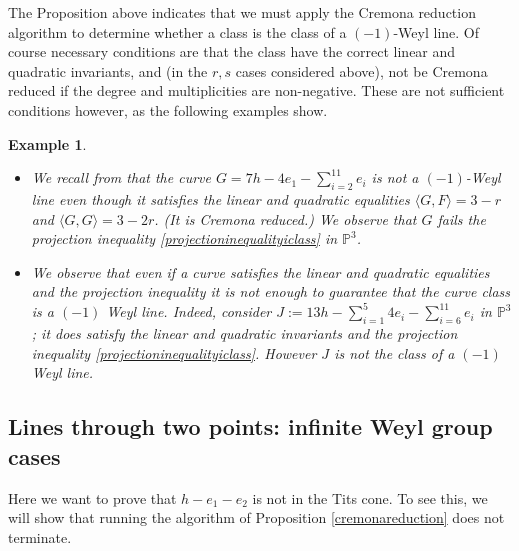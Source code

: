 \documentclass[12pt]{article}
\numberwithin{equation}{section}
\newtheorem{example}[equation]{Example}
\numberwithin{equation}{section}
\numberwithin{subeq}{equation}
\def\bbP{\mathbb{P}}
\begin{document}
The Proposition above indicates that we must apply the Cremona reduction algorithm to determine whether a class is the class of a $(-1)$-Weyl line.
Of course necessary conditions are that the class have the correct linear and quadratic invariants, and (in the $r,s$ cases considered above), not be Cremona reduced if the degree and multiplicities are non-negative.  These are not sufficient conditions however, as the following examples show.

\begin{example}\label{examplesd=7and13}
\begin{itemize}
\item[(a)]
We recall from \cite{DM2} that
the curve $G=7h-4e_1-\sum_{i=2}^{11} e_i$ is not a $(-1)$-Weyl line
even though it satisfies the linear and quadratic equalities
$\langle G, F\rangle = 3-r$
and $\langle G, G\rangle = 3-2r$.
(It is Cremona reduced.)
We observe that $G$ fails the projection inequality \eqref{projectioninequalityiclass} 
in $\bbP^3$.

\item[(b)] We observe that 
even if a curve satisfies the linear and quadratic equalities
 and the projection inequality 
it is not enough to guarantee that the curve class is a $(-1)$ Weyl line.
Indeed, consider $J:=13h-\sum_{i=1}^5 4e_i -\sum_{i=6}^{11} e_i$ in $\bbP^3$;
it does satisfy the linear and quadratic invariants and the projection inequality \eqref{projectioninequalityiclass}.
However $J$ is not the class of a $(-1)$ Weyl line.
\end{itemize}
\end{example}


\subsection{Lines through two points: infinite Weyl group cases}

Here we want to prove that
$h-e_1-e_2$ is not in the Tits cone.
To see this, we will show that running the algorithm of Proposition \ref{cremonareduction} does not terminate.
\end{document}
